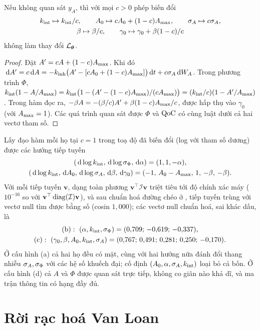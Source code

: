 \begin{proposition}
Nếu không quan sát $y_A$, thì với mọi $c>0$ phép biến đổi
\begin{gather*}
k_{\mathrm{int}}\mapsto k_{\mathrm{int}}/c,\qquad A_0\mapsto cA_0+(1-c)A_{\max},\qquad \sigma_{A}\mapsto c\sigma_{A},\\
\beta\mapsto\beta/c,\qquad \gamma_0\mapsto\gamma_0+\beta(1-c)/c
\end{gather*}
không làm thay đổi $\mathcal L_{\boldsymbol{\theta}}$.
\end{proposition}
\begin{proof}
Đặt $A'=cA+(1-c)A_{\max}$. Khi đó $\,\mathrm{d} A'=c\,\mathrm{d} A=-k_{\mathrm{inh}}\bigl(A'-[cA_0+(1-c)A_{\max}]\bigr)\,\mathrm{d} t+c\sigma_{A}\,\mathrm{d} W_A$. Trong phương trình $\Phi$, $k_{\mathrm{int}}(1-A/A_{\max})=k_{\mathrm{int}}\bigl(1-(A'-(1-c)A_{\max})/(cA_{\max})\bigr)=(k_{\mathrm{int}}/c)(1-A'/A_{\max})$. Trong hàm đọc ra, $-\beta A=-(\beta/c)A'+\beta(1-c)A_{\max}/c$, được hấp thụ vào $\gamma_0$ (với $A_{\max}=1$). Các quá trình quan sát được $\Phi$ và $\mathrm{QoC}$ có cùng luật dưới cả hai vectơ tham số.
\end{proof}

Lấy đạo hàm mỗi họ tại $c=1$ trong toạ độ đã biến đổi (log với tham số dương) được các hướng tiếp tuyến
\begin{gather*}
(\,\mathrm{d}\log k_{\mathrm{int}},\,\mathrm{d}\log\sigma_{\Phi},\,\mathrm{d}\alpha)=(1,1,-\alpha),\\
(\,\mathrm{d}\log k_{\mathrm{int}},\,\mathrm{d} A_0,\,\mathrm{d}\log\sigma_{A},\,\mathrm{d}\beta,\,\mathrm{d}\gamma_0)=(-1,\,A_0-A_{\max},\,1,\,-\beta,\,-\beta).
\end{gather*}
Với mỗi tiếp tuyến $\mathbf v$, dạng toàn phương $\mathbf v^\top\mathcal I\mathbf v$ triệt tiêu tới độ chính xác máy ($10^{-16}$ so với $\mathbf v^\top\operatorname{diag}(\mathcal I)\mathbf v$), và sau chuẩn hoá đường chéo ở , tiếp tuyến trùng với vectơ null tìm được bằng số (cosin $1{,}000$); các vectơ null chuẩn hoá, sai khác dấu, là
\begin{gather*}
\text{(b)}:\ (\alpha,\kint,\sPhi)=(0{,}709;\,-0{,}619;\,-0{,}337),\\
\text{(c)}:\ (\gamma_0,\beta,A_0,\kint,\sA)=(0{,}767;\,0{,}491;\,0{,}281;\,0{,}250;\,-0{,}170).
\end{gather*} Ở cấu hình (a) cả hai họ đều có mặt, cùng với hai hướng nữa đánh đổi thang nhiễu $\sigma_{A},\sigma_{\Phi}$ với các hệ số khuếch đại; cố định $(A_0,\alpha,\sigma_{A},k_{\mathrm{int}})$ loại bỏ cả bốn. Ở cấu hình (d) cả $A$ và $\Phi$ được quan sát trực tiếp, không co giãn nào khả dĩ, và ma trận thông tin có hạng đầy đủ.

\section{Rời rạc hoá Van Loan}
\label{app:vanloan}

